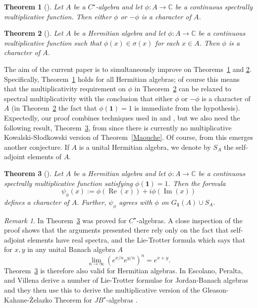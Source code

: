 \documentclass{amsart}
\newtheorem{theorem}{Theorem}[section]
\theoremstyle{definition}
\theoremstyle{remark}
\newtheorem*{remark}{Remark}
\DeclareMathOperator{\Ima}{Im}
\DeclareMathOperator{\Rea}{Re}
\begin{document}
	\begin{theorem}[{\cite[Corollary 3.8]{Toure2}}]\label{TBS}
		Let $A$ be a $C^\star$-algebra and let $\phi:A\to\mathbb C$ be a continuous spectrally multiplicative function. Then either $\phi$ or $-\phi$ is a character of $A$. 
	\end{theorem}
	

	
	\begin{theorem}[{\cite[Theorem 1.2]{Mabrouk}}]\label{MKB}
		 Let $A$ be a Hermitian algebra and let $\phi:A\to\mathbb C$ be a continuous multiplicative function such that $\phi(x)\in\sigma(x)$ for each $x\in A$. Then $\phi$ is a character of $A$. 
	\end{theorem}
	
	
The aim of the current paper is to simultaneously improve on Theorems~\ref{TBS} and \ref{MKB}. Specifically, Theorem~\ref{TBS} holds for all Hermitian algebras; of course this means that the multiplicativity requirement on $\phi$ in Theorem~\ref{MKB} can be relaxed to spectral multiplicativity with the conclusion that either $\phi$ or $-\phi$ is a character of $A$ (in Theorem~\ref{MKB} the fact that $\phi(\mathbf 1)=1$ is immediate from the hypothesis). Expectedly, our proof combines techniques used in 
\cite{Mabrouk} and \cite{Toure2}, but we also need the following result, Theorem~\ref{TSB}, from \cite{Toure1} since there is currently no multiplicative Kowalski-S\l{}odkowski version of Theorem~\ref{Maouche}. Of course, from this emerges another conjecture. If $A$ is a unital Hermitian algebra, we denote by $S_A$ the self-adjoint elements of $A$.

	\begin{theorem}[{\cite[Theorem 3.7, Theorem 3.9]{Toure1}}]\label{TSB}
	Let $A$ be a Hermitian algebra and let $\phi:A\to\mathbb C$ be a continuous spectrally multiplicative function satisfying $\phi(\mathbf 1)=1$. Then the formula $$\psi_\phi(x):=\phi\left(\Rea(x)\right)+i\phi\left(\Ima(x)\right)$$ defines a character of $A$. Further, $\psi_\phi$ agrees with $\phi$ on $G_{\mathbf 1}(A)\cup S_A.$
\end{theorem}

\begin{remark}
	In \cite{Toure1} Theorem~\ref{TSB} was proved for $C^\star$-algebras. A close inspection of the proof shows that the arguments presented there rely only on the fact that self-adjoint elements have real spectra, and the Lie-Trotter formula which says that for $x,y$ in any unital Banach algebra $A$
	$$\lim_{n\rightarrow\infty}\left(e^{x/n}e^{y/n}\right)^n=e^{x+y}.$$	
	Theorem~\ref{TSB} is therefore also valid for Hermitian algebras. 
	In \cite{EPV} Escolano, Peralta, and Villena derive a number of Lie-Trotter formulae for Jordan-Banach algebras and they then use this to derive the multiplicative version of the Gleason-Kahane-\.{Z}elazko Theorem for $JB^\star$-algebras \cite[Theorem 4.3]{EPV}. 
\end{remark}	
\end{document}
